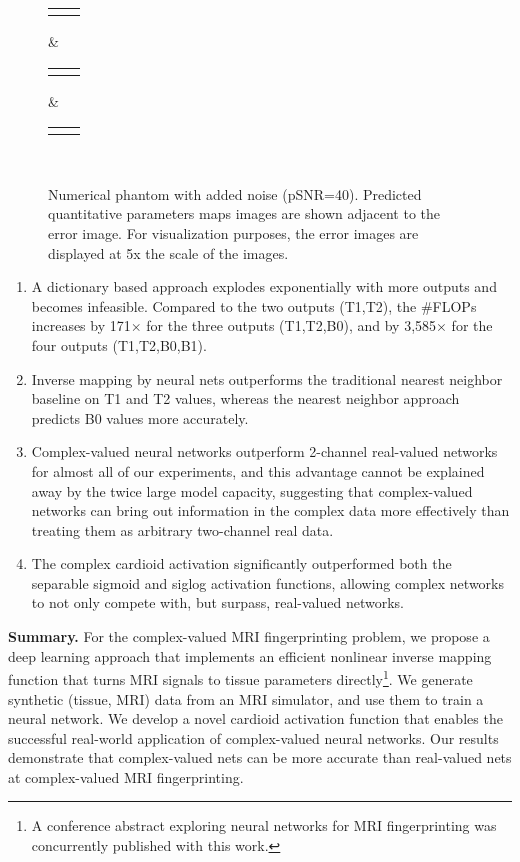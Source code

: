 \documentclass{article}
\def\imw#1#2{\fbox{\texttt{[image: figures/\#1.png]}}}
\newcommand{\tb}[3]{\setlength{\tabcolsep}{#2mm}\begin{tabular}{#1}#3\end{tabular}}
\begin{document}
\begin{figure*}[t]
{\tb{cc}{\widthB}{
	\imw{complex/net_stages2_MNI_pSNR_40_T1_estimated_crop}{\widthA} &
	\imw{complex/net_stages2_MNI_pSNR_40_T1_err_5x_crop}{\widthA}
} &
\tb{cc}{\widthB}{
	\imw{complex/net_stages2_MNI_pSNR_40_T2_estimated_crop}{\widthA} &
	\imw{complex/net_stages2_MNI_pSNR_40_T2_err_5x_crop}{\widthA}
} &
\tb{cc}{\widthB}{
	\imw{complex/net_stages2_MNI_pSNR_40_B0_estimated_crop}{\widthA} &
	\imw{complex/net_stages2_MNI_pSNR_40_B0_err_5x_crop}{\widthA}
}
\\
\bottomrule
}
\caption{Numerical phantom with added noise (pSNR=40). Predicted quantitative parameters maps images are shown adjacent to the error image. For visualization purposes, the error images are displayed at 5x the scale of the images. }
\label{fig:results_pSNR40}
\end{figure*}



\begin{enumerate}
\setlength{\itemsep}{0pt}
\item 
A dictionary based approach explodes exponentially with more outputs and becomes infeasible.  
Compared to the two outputs (T1,T2), the \#FLOPs increases by 171$\times$ for the three outputs (T1,T2,B0), 
and by 3,585$\times$ for the four outputs (T1,T2,B0,B1).
\item
Inverse mapping by neural nets outperforms the traditional nearest neighbor baseline on T1 and T2 values, whereas the nearest neighbor approach predicts B0 values more accurately.
\item
Complex-valued neural networks outperform 2-channel real-valued networks for almost all of our experiments, and this advantage cannot be explained away by the twice large model capacity, suggesting that complex-valued networks can bring out information in the complex data more effectively than treating them as arbitrary two-channel real data.
\item
The complex cardioid activation significantly outperformed both the separable sigmoid and siglog activation functions, allowing complex networks to not only compete with, but surpass, real-valued networks.
\end{enumerate}

{\bf Summary.}
For the complex-valued MRI fingerprinting problem, 
we propose a deep learning approach that implements an efficient
nonlinear inverse mapping function that turns MRI signals to tissue parameters directly\footnote{A conference abstract exploring neural networks for MRI fingerprinting \cite{mrf_net_ismrm17} was concurrently published with this work.}.
We generate synthetic (tissue, MRI) data from an MRI simulator, and use
them to train a neural network.  We develop a novel cardioid activation function that enables the successful real-world application of complex-valued neural networks.  Our results demonstrate that complex-valued nets can be more accurate than real-valued nets at complex-valued MRI fingerprinting.  
\end{document}
